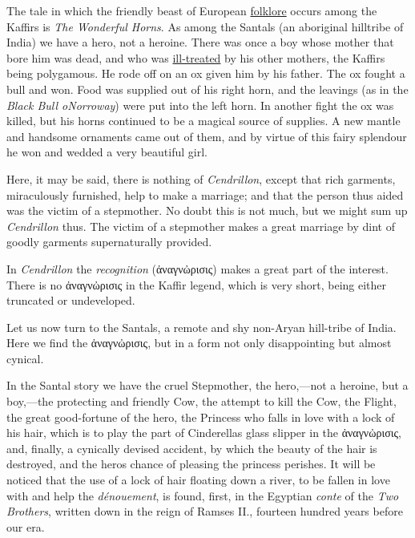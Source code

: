 \documentclass[14pt,a4paper]{memoir}
\newcommand{\ul}[1]{\uline{#1}}
\begin{document}
{The tale in which the friendly beast of European \ul{folklore} occurs
among the Kaffirs is \emph{The Wonderful
Horns}.
As among the Santals (an \textquotesingle aboriginal\textquotesingle{}
hilltribe of India) we have a hero, not a heroine.
\textquotesingle There was once a boy whose mother that bore him was
dead, and who was \ul{ill-treated} by his other
mothers,\textquotesingle{} the Kaffirs being polygamous. He rode off on
an ox given him by his father. The ox fought a bull and won. Food was
supplied out of his right horn, and the
\textquotesingle leavings\textquotesingle{} (as in the \emph{Black Bull
o\textquotesingle Norroway}) were put into the left horn. In another
fight the ox was killed, but his horns continued to be a magical source
of supplies. A new mantle and handsome ornaments came out of them, and
by virtue of this fairy splendour he won and wedded a very beautiful
girl.

Here, it may be said, there is nothing of \emph{Cendrillon}, except that
rich garments, miraculously furnished, help to make a marriage; and that
the person thus aided was the victim of a stepmother. No doubt this is
not much, but we might sum up \emph{Cendrillon} thus. The victim of a
stepmother makes a great marriage by dint of goodly garments
supernaturally provided.

In \emph{Cendrillon} the \emph{recognition} (ἀναγνὠρισις) makes a great
part of the interest. There is no ἀναγνὠρισις in the Kaffir legend,
which is very short, being either truncated or undeveloped.

Let us now turn to the Santals, a remote and shy non-Aryan hill-tribe of
India. Here we find the ἀναγνὠρισις, but in a form not only
disappointing but almost
cynical.

In the Santal story we have the cruel Stepmother, the hero,---not a
heroine, but a boy,---the protecting and friendly Cow, the attempt to
kill the Cow, the Flight, the great good-fortune of the hero, the
Princess who falls in love with a lock of his hair, which is to play the
part of Cinderella\textquotesingle s glass slipper in the ἀναγνὠρισις,
and, finally, a cynically devised accident, by which the beauty of the
hair is destroyed, and the hero\textquotesingle s chance of pleasing the
princess perishes. It will be noticed that the use of a lock of hair
floating down a river, to be fallen in love with and help the
\emph{dénouement}, is found, first, in the Egyptian \emph{conte} of the
\emph{Two Brothers}, written down in the reign of Ramses II., fourteen
hundred years before our era.

}
\end{document}
